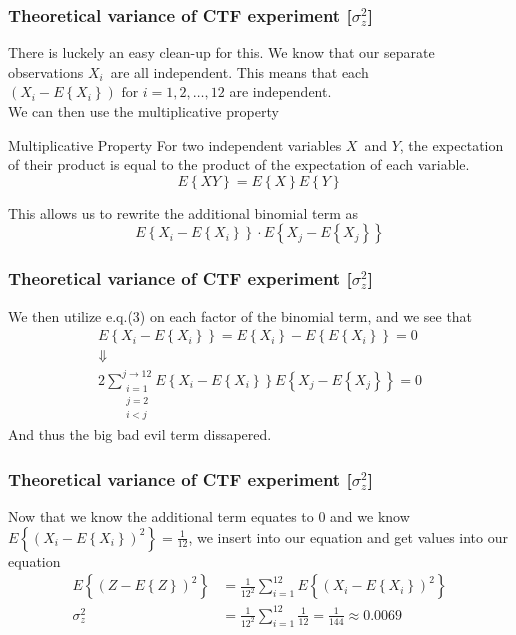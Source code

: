 \documentclass[compress]{beamer}
\newcommand{\E}[1]{\ensuremath{E\left\{#1\right\}}}
\begin{document}
\begin{frame}
    \frametitle{Theoretical variance of CTF experiment [$\sigma_z^2$]}
    There is luckely an easy clean-up for this. We know that our separate 
    observations $X_i$ are all independent. This means that each
    $\left(X_i-\E{X_i}\right) \text{ for } i=1,2,\dots,12$ are independent. \\
    We can then use the multiplicative property
    \begin{alertblock}{Multiplicative Property}
        For two independent variables $X$ and $Y$, the expectation of their
        product is equal to the product of the expectation of each variable.
        \begin{equation*}
            \E{XY} = \E{X}\E{Y}
        \end{equation*}
    \end{alertblock}
    This allows us to rewrite the additional binomial term as
    \begin{equation*}
        \E{X_i-\E{X_i}}\cdot\E{X_j-\E{X_j}}
    \end{equation*}
\end{frame} 

\begin{frame}
    \frametitle{Theoretical variance of CTF experiment [$\sigma_z^2$]}
    We then utilize e.q.(3) on each factor of the binomial term,
    and we see that 
    \begin{gather*}
        \E{X_i-\E{X_i}} = \E{X_i}-\E{\E{X_i}}  =  0 \\
        \Downarrow \\
        2 \sum^{j\rightarrow12}_{\substack{i=1\\j=2\\i<j}}
        { \E{X_i-\E{X_i}}\E{X_j-\E{X_j}}} = 0
    \end{gather*}
    And thus the big bad evil term dissapered.
\end{frame}

\begin{frame}
    \frametitle{Theoretical variance of CTF experiment [$\sigma_z^2$]}
    Now that we know the additional term equates to 0 and we know
    $\E{\left(X_i - \E{X_i}\right)^2}=\frac{1}{12}$, we insert into our
    equation and get
    values into our equation
    \begin{align*}
        \E{\left(Z-\E{Z}\right)^2} 
        & = \frac{1}{12^2}\sum^{12}_{i=1}
        {\E{\left(X_i - \E{X_i}\right)^2}} \\
        \sigma_z^2  & = \frac{1}{12^2}\sum^{12}_{i=1}
        {\frac{1}{12}} = \frac{1}{144} \approx 0.0069
    \end{align*}
\end{frame}
\end{document}
